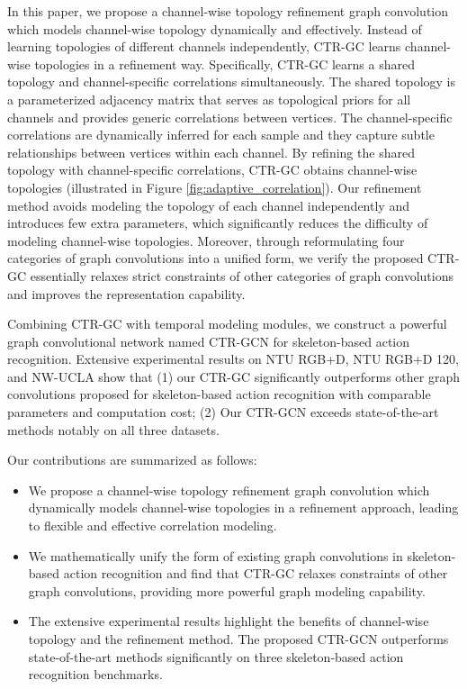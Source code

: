 \documentclass[10pt,twocolumn,letterpaper]{article}
\begin{document}
In this paper, we propose a channel-wise topology refinement graph convolution which models channel-wise topology dynamically and effectively. Instead of learning topologies of different channels independently, CTR-GC learns channel-wise topologies in a refinement way. Specifically, CTR-GC learns a shared topology and channel-specific correlations simultaneously. The shared topology is a parameterized adjacency matrix that serves as topological priors for all channels and provides generic correlations between vertices. The channel-specific correlations are dynamically inferred for each sample and they capture subtle relationships between vertices within each channel. By refining the shared topology with channel-specific correlations, CTR-GC obtains channel-wise topologies (illustrated in Figure \ref{fig:adaptive_correlation}). Our refinement method avoids modeling the topology of each channel independently and introduces few extra parameters, which significantly reduces the difficulty of modeling channel-wise topologies. 
Moreover, through reformulating four categories of graph convolutions into a unified form, we verify the proposed CTR-GC essentially relaxes strict constraints of other categories of graph convolutions and improves the representation capability.

Combining CTR-GC with temporal modeling modules, we construct a powerful graph convolutional network named CTR-GCN for skeleton-based action recognition. Extensive experimental results on NTU RGB+D, NTU RGB+D 120, and NW-UCLA show that (1) our CTR-GC significantly outperforms other graph convolutions proposed for skeleton-based action recognition with comparable parameters and computation cost; (2) Our CTR-GCN exceeds state-of-the-art methods notably on all three datasets.


Our contributions are summarized as follows:

\begin{itemize}
	\item We propose a channel-wise topology refinement graph convolution which dynamically models channel-wise topologies in a refinement approach, leading to flexible and effective correlation modeling.
	\item We mathematically unify the form of existing graph convolutions in skeleton-based action recognition and find that CTR-GC relaxes constraints of other graph convolutions, providing more powerful graph modeling capability.
	\item The extensive experimental results highlight the benefits of channel-wise topology and the refinement method. The proposed CTR-GCN outperforms state-of-the-art methods significantly on three skeleton-based action recognition benchmarks.
\end{itemize}
\end{document}
